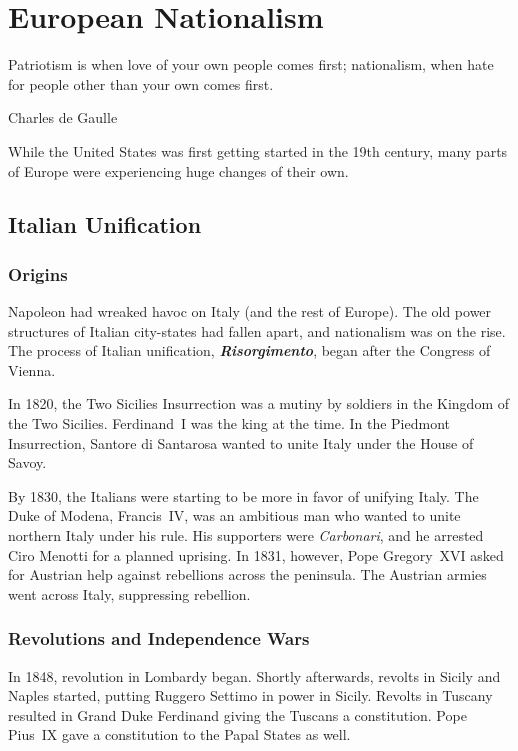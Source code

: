 \chapter{European Nationalism}

\epigraph{%
  Patriotism is when love of your own people comes first;
  nationalism, when hate for people other than your own comes first.
}{Charles de Gaulle}

While the United States was first getting started in the 19th century,
many parts of Europe were experiencing huge changes of their own.

\section{Italian Unification}

\subsection*{Origins}

Napoleon had wreaked havoc on Italy (and the rest of Europe).
The old power structures of Italian city-states had fallen apart, and nationalism was on the rise.
The process of Italian unification, \textbf{\textit{Risorgimento}}, began after the Congress of Vienna.

In 1820, the Two Sicilies Insurrection was a mutiny by soldiers in the Kingdom of the Two Sicilies.
Ferdinand~I was the king at the time.
In the Piedmont Insurrection, Santore di Santarosa wanted to unite Italy under the House of Savoy.

By 1830, the Italians were starting to be more in favor of unifying Italy.
The Duke of Modena, Francis~IV, was an ambitious man who wanted to unite northern Italy under his rule.
His supporters were \textit{Carbonari}, and he arrested Ciro Menotti for a planned uprising.
In 1831, however, Pope Gregory~XVI asked for Austrian help against rebellions across the peninsula.
The Austrian armies went across Italy, suppressing rebellion.

\subsection*{Revolutions and Independence Wars}

In 1848, revolution in Lombardy began.
Shortly afterwards, revolts in Sicily and Naples started, putting Ruggero Settimo in power in Sicily.
Revolts in Tuscany resulted in Grand Duke Ferdinand giving the Tuscans a constitution.
Pope Pius~IX gave a constitution to the Papal States as well.

